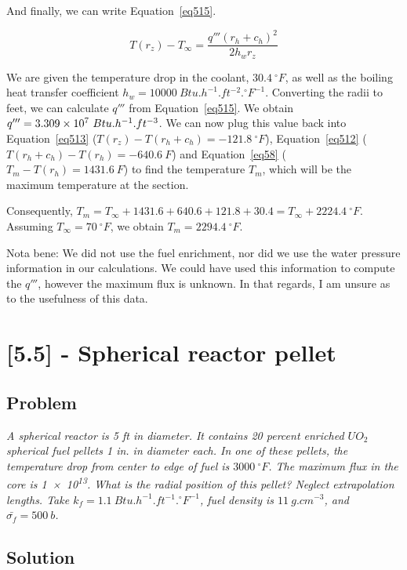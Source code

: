 And finally, we can write Equation~\ref{eq515}.


\begin{equation}\label{eq515}
T(r_z)-T_{\infty} = \frac{q'''(r_h+c_h)^2}{2h_wr_z}
\end{equation}

We are given the temperature drop in the coolant, $30.4\ {}^\circ F$, as well as the boiling heat transfer coefficient $h_w = 10000\ Btu.h^{-1}.ft^{-2}.{}^\circ F^{-1}$. Converting the radii to feet, we can calculate $q'''$ from Equation~\ref{eq515}. We obtain $q''' = \text{\num{3.309e7}}\ Btu.h^{-1}.ft^{-3}$. We can now plug this value back into Equation~\ref{eq513} ($T(r_z)-T(r_h+c_h) = -121.8\ {}^\circ F$), Equation~\ref{eq512} ($T(r_h+c_h)-T(r_h) = -640.6\ F$) and Equation~\ref{eq58} ($T_m - T(r_h) = 1431.6\ F$) to find the temperature $T_m$, which will be the maximum temperature at the section.

Consequently, $T_m = T_{\infty} + 1431.6 + 640.6 + 121.8 + 30.4 = T_{\infty} + 2224.4\ {}^\circ F$. Assuming $T_{\infty} = 70\ {}^\circ F$, we obtain $T_m = 2294.4\ {}^\circ F$.


Nota bene: We did not use the fuel enrichment, nor did we use the water pressure information in our calculations. We could have used this information to compute the $q'''$, however the maximum flux is unknown. In that regards, I am unsure as to the usefulness of this data.

\section{[5.5] - Spherical reactor pellet}
\label{prob52}

\subsection{Problem}
\textit{A spherical reactor is 5 ft in diameter. It contains 20 percent enriched $UO_2$ spherical fuel pellets 1 in. in diameter each. In one of these pellets, the temperature drop from center to edge of fuel is $3000\ {}^\circ F$. The maximum flux in the core is \num{1e13}. What is the radial position of this pellet? Neglect extrapolation lengths. Take $k_f = 1.1\ Btu.h^{-1}.ft^{-1}.{}^\circ F^{-1}$, fuel density is $11\ g.cm^{-3}$, and $\bar{\sigma_f} = 500\ b$.}

\subsection{Solution}

